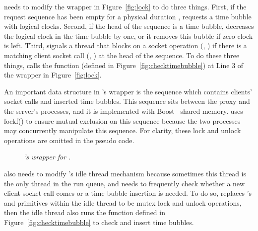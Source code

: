 \xxx needs to modify the \mutexlock wrapper in Figure~\ref{fig:lock} to do 
three things. First, if the \paxos request sequence has been empty for a 
physical duration \ntimeout, \xxx requests a time bubble with \nclock logical 
clocks. Second, if the head of the \paxos sequence is a time bubble, \xxx 
decreases the logical clock in the time bubble by one, or it removes this bubble 
if zero clock is left. Third, \xxx signals a thread that blocks on a socket 
operation (\eg, \recv) if there is a matching client socket call (\eg, \send) at 
the head of the \paxos sequence. To do these three things, \xxx calls the 
\checktimebubble function (defined in Figure~\ref{fig:checktimebubble}) at Line 
3 of the \mutexlock wrapper in Figure~\ref{fig:lock}.

An important data structure in \xxx's wrapper is the \paxos sequence which 
contains clients' socket calls and inserted time bubbles. This sequence sits 
between the proxy and the server's processes, and it is implemented with 
Boost~\cite{boost} shared memory. \xxx uses \v{lockf()} to ensure mutual 
exclusion on this sequence because the two processes may concurrently 
manipulate this sequence. For clarity, these lock and unlock operations are 
omitted in the pseudo code.

\begin{figure}[t]
\centering
\begin{minipage}{.5\textwidth}
\end{minipage}
\vspace{-.1in}
\caption{{\em \xxx's wrapper for \recv.}} 
\label{fig:recv}
\vspace{-.05in}
\end{figure}

\xxx also needs to modify \parrot's idle thread mechanism because sometimes 
this thread is the only thread in the run queue, and \xxx needs to frequently 
check whether a new client socket call comes or a time bubble insertion is 
needed. To do so, \xxx replaces \parrot's \getturn and \putturn primitives 
within the idle thread to be mutex lock and unlock operations, then the idle 
thread also runs the function defined in Figure~\ref{fig:checktimebubble} to 
check and insert time bubbles.


